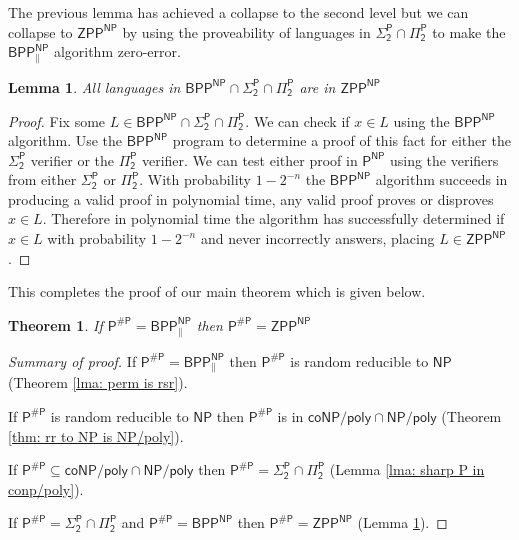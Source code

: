 \documentclass{article}
\newtheorem*{theorem*}{Theorem}
\newtheorem{lemma}[theorem]{Lemma}
\begin{document}
The previous lemma has achieved a collapse to the second level but we can collapse to $\mathsf{ZPP^{NP}}$ by using the proveability of languages in $\mathsf{\Sigma_2^P\cap \Pi_2^P}$ to make the $\mathsf{BPP^{NP}_{\parallel}}$ algorithm zero-error.

\begin{lemma}\label{lma: sharp P in ZPP}
    All languages in $\mathsf{BPP^{NP}\cap\Sigma_2^P\cap \Pi_2^P}$ are in $\mathsf{ZPP^{NP}}$
\end{lemma}
\begin{proof}
    Fix some $L\in \mathsf{BPP^{NP}\cap\Sigma_2^P\cap \Pi_2^P}$. We can check if $x\in L$ using the $\mathsf{BPP^{NP}}$ algorithm. Use the $\mathsf{BPP^{NP}}$ program to determine a proof of this fact for either the $\mathsf{\Sigma_2^P}$ verifier or the $\mathsf{\Pi_2^P}$ verifier. We can test either proof in $\mathsf{P^{NP}}$ using the verifiers from either $\mathsf{\Sigma_2^{P}}$ or $\mathsf{\Pi_2^{P}}$. With probability $1-2^{-n}$ the $\mathsf{BPP^{NP}}$ algorithm succeeds in producing a valid proof in polynomial time, any valid proof proves or disproves $x\in L$. Therefore in polynomial time the algorithm has successfully determined if $x\in L$ with probability $1-2^{-n}$ and never incorrectly answers, placing $L\in \mathsf{ZPP^{NP}}$.
\end{proof}

This completes the proof of our main theorem which is given below.

\begin{theorem*}
    If $\mathsf{P^{\# P} = BPP^{NP}_{\parallel}}$ then $\mathsf{P^{\# P} = ZPP^{NP}}$
\end{theorem*}
\begin{proof}[Summary of proof]
    If $\mathsf{P^{\# P} = BPP^{NP}_{\parallel}}$ then $\mathsf{P^{\#P}}$ is random reducible to $\mathsf{NP}$ (Theorem \ref{lma: perm is rsr}).

    If $\mathsf{P^{\# P}}$ is random reducible to $\mathsf{NP}$ then $\mathsf{P^{\#P}}$ is in $\mathsf{coNP/poly \cap NP/poly}$ (Theorem \ref{thm: rr to NP is NP/poly}).

    If $\mathsf{P^{\#P}\subseteq coNP/poly \cap NP/poly}$ then $\mathsf{P^{\#P}} = \mathsf{\Sigma_2^P\cap \Pi_2^P}$ (Lemma \ref{lma: sharp P in conp/poly}).

    If $\mathsf{P^{\#P}} = \mathsf{\Sigma_2^P\cap \Pi_2^P}$ and $\mathsf{P^{\#P}= BPP^{NP}}$ then $\mathsf{P^{\#P}= ZPP^{NP}}$ (Lemma \ref{lma: sharp P in ZPP}).
\end{proof}
\end{document}
